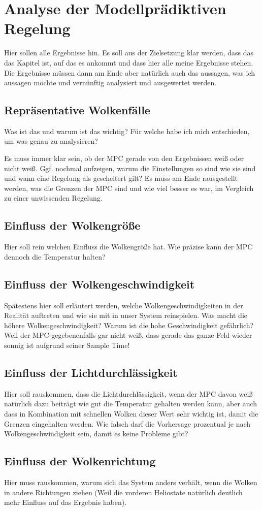 \chapter{Analyse der Modellprädiktiven Regelung} \label{ch_AnalyseRegelung}
Hier sollen alle Ergebnisse hin.
Es soll aus der Zielsetzung klar werden, dass das das Kapitel ist, auf das es ankommt und dass hier alle meine Ergebnisse stehen.
Die Ergebnisse müssen dann am Ende aber natürlich auch das aussagen, was ich aussagen möchte und vernünftig analysiert und ausgewertet werden.

\section{Repräsentative Wolkenfälle} \label{sec_Wolkenfälle}
Was ist das und warum ist das wichtig?
Für welche habe ich mich entschieden, um was genau zu analysieren?

Es muss immer klar sein, ob der MPC gerade von den Ergebnissen weiß oder nicht weiß.
Ggf. nochmal aufzeigen, warum die Einstellungen so sind wie sie sind und wann eine Regelung als gescheitert gilt?
Es muss am Ende rausgestellt werden, was die Grenzen der MPC sind und wie viel besser es war, im Vergleich zu einer unwissenden Regelung.

\section{Einfluss der Wolkengröße} \label{sec_EinflussGröße}
Hier soll rein welchen Einfluss die Wolkengröße hat.
Wie präzise kann der MPC dennoch die Temperatur halten?

\section{Einfluss der Wolkengeschwindigkeit} \label{sec_EinflussGeschwindigkeit}
Spätestens hier soll erläutert werden, welche Wolkengeschwindigkeiten in der Realität auftreten und wie sie mit in unser System reinspielen.
Was macht die höhere Wolkengeschwindigkeit? Warum ist die hohe Geschwindigkeit gefährlich?
Weil der MPC gegebenenfalls gar nicht weiß, dass gerade das ganze Feld wieder sonnig ist aufgrund seiner Sample Time!

\section{Einfluss der Lichtdurchlässigkeit} \label{sec_EinflussLichtdurchlässigkeit}
Hier soll rauskommen, dass die Lichtdurchlässigkeit, wenn der MPC davon weiß natürlich dazu beiträgt wie gut die Temperatur gehalten werden kann, aber auch dass in Kombination mit schnellen Wolken dieser Wert sehr wichtig ist, damit die Grenzen eingehalten werden.
Wie falsch darf die Vorhersage prozentual je nach Wolkengeschwindigkeit sein, damit es keine Probleme gibt?

\section{Einfluss der Wolkenrichtung} \label{sec_EinflussRichtung}
Hier muss rauskommen, warum sich das System anders verhält, wenn die Wolken in andere Richtungen ziehen (Weil die vorderen Heliostate natürlich deutlich mehr Einfluss auf das Ergebnis haben).

